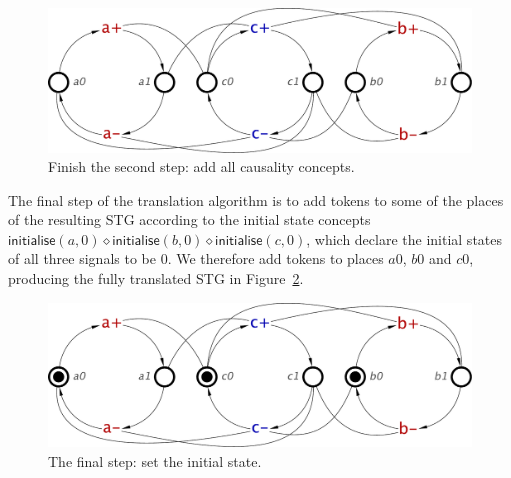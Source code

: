 \documentclass[british, journal]{IEEEtran}
\begin{document}
\begin{figure}[h]
\vspace{-1mm}
\begin{centering}
\includegraphics[scale=0.3]{Images/Step-by-step9}
\par
\vspace{-1mm}
\protect\caption{\label{fig:step-by-step9}Finish the second step: add all causality concepts.}
\par\end{centering}
\vspace{-2mm}
\end{figure}

The final step of the translation algorithm is to add tokens to some of the places
of the resulting STG according to the initial state concepts
$\mathsf{initialise}(a,0) \diamond \mathsf{initialise}(b,0) \diamond \mathsf{initialise}(c,0)$, which declare the initial states of all three signals to be 0. We therefore
add tokens to places $a0$, $b0$ and $c0$, producing the fully translated STG in
Figure~\ref{fig:step-by-step12}.

\begin{figure}[h]
\vspace{-2mm}
\begin{centering}
\includegraphics[scale=0.3]{Images/Step-by-step12}
\par
\vspace{-1mm}
\protect\caption{\label{fig:step-by-step12}The final step: set the initial state.}
\par\end{centering}
\vspace{-1mm}
\end{figure}
\end{document}
